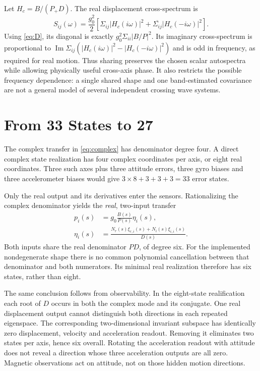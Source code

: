 \documentclass[conference]{IEEEtran}
\DeclareMathOperator{\Ima}{Im}
\begin{document}
Let $H_c=B/(P_+D)$. The real displacement cross-spectrum is
\begin{equation}
 S_{ij}(\omega)=\frac{g_0^2}{2}
 \left[\Sigma_{ij}|H_c(i\omega)|^2+
       \overline{\Sigma_{ij}}|H_c(-i\omega)|^2\right].
 \label{eq:crossspectrum}
\end{equation}
Using \cref{eq:D}, its diagonal is exactly
$g_0^2\Sigma_{ii}|B/P|^2$. Its imaginary cross-spectrum is proportional to
$\Ima\Sigma_{ij}(|H_c(i\omega)|^2-|H_c(-i\omega)|^2)$ and is odd in
frequency, as required for real motion. Thus sharing preserves the chosen
scalar autospectra while allowing physically useful cross-axis phase.
It also restricts the possible frequency dependence: a single shared shape
and one band-estimated covariance are not a general model of several
independent crossing wave systems.

\section{From 33 States to 27}
\label{sec:reduction}
The complex transfer in \cref{eq:complex} has denominator degree four.
A direct complex state realization has four complex coordinates per
axis, or eight real coordinates. Three such axes plus three attitude
errors, three gyro biases and three accelerometer biases would give
$3\times8+3+3+3=33$ error states.

Only the real output and its derivatives enter the sensors. Rationalizing
the complex denominator yields the \emph{real}, two-input transfer
\begin{equation}
 \begin{aligned}
 p_i(s)&=g_0\frac{B(s)}{P(s)}\eta_i(s),\\
 \eta_i(s)&=\frac{N_r(s)\xi_{r,i}(s)+N_i(s)\xi_{i,i}(s)}{D(s)}.
 \end{aligned}
 \label{eq:realtransfer}
\end{equation}
Both inputs share the real denominator $PD$, of degree six. For the
implemented nondegenerate shape there is no common polynomial cancellation
between that denominator and both numerators. Its minimal real realization
therefore has six states, rather than eight.

The same conclusion follows from observability. In the eight-state
realification each root of $D$ occurs in both the complex mode and its
conjugate. One real displacement output cannot distinguish both directions
in each repeated eigenspace. The corresponding two-dimensional invariant
subspace has identically zero displacement, velocity and acceleration
readout. Removing it eliminates two states per axis, hence six overall.
Rotating the acceleration readout with attitude does not reveal a direction
whose three acceleration outputs are all zero. Magnetic observations act
on attitude, not on those hidden motion directions.
\end{document}

